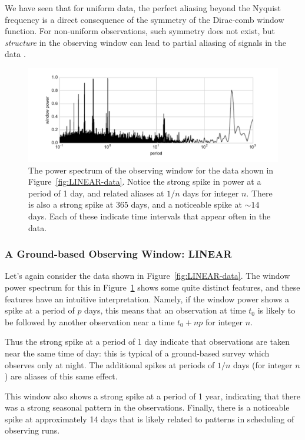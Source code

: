 \documentclass[preprint]{aastex}
\newcommand{\fig}[1]{Figure~\ref{fig:#1}}
\newcommand{\figlabel}[1]{\label{fig:#1}}
\begin{document}
We have seen that for uniform data, the perfect aliasing beyond the Nyquist
frequency is a direct consequence of the symmetry of the Dirac-comb window
function.
For non-uniform observations, such symmetry does not exist, but {\it structure}
in the observing window can lead to partial aliasing of signals in the
data \citep[see, e.g.][]{Deeming75}.


\begin{figure}[ht]
  \centering
  \includegraphics[width=\textwidth]{fig14_LINEAR_window}
  \caption{The power spectrum of the observing window for the data shown
    in \fig{LINEAR-data}. Notice the strong spike in power at a period of
    1 day, and related aliases at $1/n$ days for integer $n$.
    There is also a strong spike at $365$ days, and a noticeable spike at
    $\sim 14$ days. Each of these indicate time intervals that appear often
    in the data.
    \figlabel{LINEAR-window}}
\end{figure}

\subsubsection{A Ground-based Observing Window: LINEAR}

Let's again consider the data shown in \fig{LINEAR-data}. The window power
spectrum for this in \fig{LINEAR-window} shows some quite distinct features,
and these features have an intuitive interpretation.
Namely, if the window power shows a spike at a period of $p$ days, this means
that an observation at time $t_0$ is likely to be followed by another
observation near a time $t_0 + np$ for integer $n$.

Thus the strong spike at a period of 1 day indicate that observations are
taken near the same time of day: this is typical of a ground-based survey
which observes only at night.
The additional spikes at periods of $1/n$ days (for integer $n$) are aliases
of this same effect.

This window also shows a strong spike at a period of 1 year, indicating that
there was a strong seasonal pattern in the observations.
Finally, there is a noticeable spike at approximately 14 days that is likely
related to patterns in scheduling of observing runs.
\end{document}
